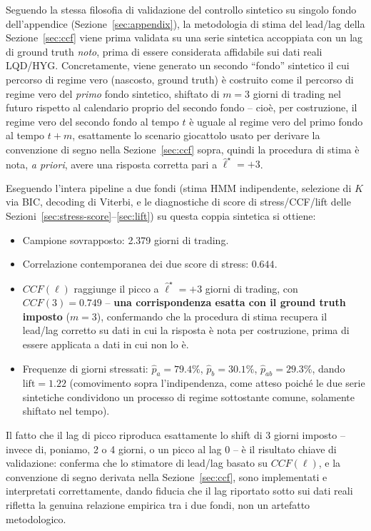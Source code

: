 \documentclass[11pt]{article}
\theoremstyle{definition}
\theoremstyle{remark}
\begin{document}
Seguendo la stessa filosofia di validazione del controllo sintetico su singolo fondo dell'appendice (Sezione~\ref{sec:appendix}), la metodologia di stima del lead/lag della Sezione~\ref{sec:ccf} viene prima validata su una serie sintetica accoppiata con un lag di ground truth \emph{noto}, prima di essere considerata affidabile sui dati reali LQD/HYG. Concretamente, viene generato un secondo ``fondo'' sintetico il cui percorso di regime vero (nascosto, ground truth) \`e costruito come il percorso di regime vero del \emph{primo} fondo sintetico, shiftato di $m=3$ giorni di trading nel futuro rispetto al calendario proprio del secondo fondo -- cio\`e, per costruzione, il regime vero del secondo fondo al tempo $t$ \`e uguale al regime vero del primo fondo al tempo $t+m$, esattamente lo scenario giocattolo usato per derivare la convenzione di segno nella Sezione~\ref{sec:ccf} sopra, quindi la procedura di stima \`e nota, \emph{a priori}, avere una risposta corretta pari a $\widehat\ell^\star=+3$.

Eseguendo l'intera pipeline a due fondi (stima HMM indipendente, selezione di $K$ via BIC, decoding di Viterbi, e le diagnostiche di score di stress/CCF/lift delle Sezioni~\ref{sec:stress-score}--\ref{sec:lift}) su questa coppia sintetica si ottiene:
\begin{itemize}
    \item Campione sovrapposto: 2.379 giorni di trading.
    \item Correlazione contemporanea dei due score di stress: $0.644$.
    \item $CCF(\ell)$ raggiunge il picco a $\widehat\ell^\star=+3$ giorni di trading, con $CCF(3)=0.749$ -- \textbf{una corrispondenza esatta con il ground truth imposto} ($m=3$), confermando che la procedura di stima recupera il lead/lag corretto su dati in cui la risposta \`e nota per costruzione, prima di essere applicata a dati in cui non lo \`e.
    \item Frequenze di giorni stressati: $\widehat p_a=79.4\%$, $\widehat p_b=30.1\%$, $\widehat p_{ab}=29.3\%$, dando $\mathrm{lift}=1.22$ (comovimento sopra l'indipendenza, come atteso poich\'e le due serie sintetiche condividono un processo di regime sottostante comune, solamente shiftato nel tempo).
\end{itemize}
Il fatto che il lag di picco riproduca esattamente lo shift di 3 giorni imposto -- invece di, poniamo, 2 o 4 giorni, o un picco al lag 0 -- \`e il risultato chiave di validazione: conferma che lo stimatore di lead/lag basato su $CCF(\ell)$, e la convenzione di segno derivata nella Sezione~\ref{sec:ccf}, sono implementati e interpretati correttamente, dando fiducia che il lag riportato sotto sui dati reali rifletta la genuina relazione empirica tra i due fondi, non un artefatto metodologico.
\end{document}
